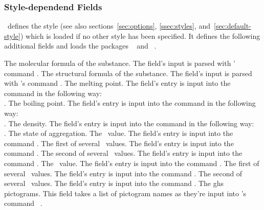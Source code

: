 \documentclass[load-preamble+]{cnltx-doc}
\begin{document}
\subsubsection{Style-dependend Fields}
\substances\ defines the style  (see also
sections~\ref{sec:options}, \ref{ssec:styles}, and~\ref{sec:default-style})
which is loaded if no other style has been specified. It defines the following
additional fields and loads the packages ~\cite{pkg:chemfig} and
~\cite{pkg:siunitx}.
\begin{options}
    The molecular formula of the substance. The field's input is parsed with
    ' command .
    The structural formula of the substance. The field's input is parsed with
    's command .
    The melting point. The field's entry is input into the 
    command  in the following way: \\
    .
    The boiling point. The field's entry is input into the 
    command  in the following way: \\
    .
    The density. The field's entry is input into the  command
     in the following way: \\
    .
    The state of aggregation.
    The \pKa\ value. The field's entry is input into the  command
    .
    The first of several \pKa\ values. The field's entry is input into the
     command .
    The second of several \pKa\ values. The field's entry is input into the
     command .
    The \pKb\ value. The field's entry is input into the  command
    .
    The first of several \pKb\ values. The field's entry is input into the
     command .
    The second of several \pKb\ values. The field's entry is input into the
     command .
    The \acs{ghs} pictograms. This field takes a list of pictogram names as
    they're input into 's command
    ~\cite{pkg:ghsystem}.

\end{options}
\end{document}
